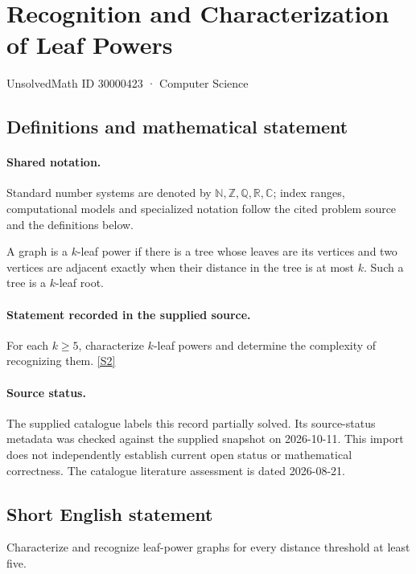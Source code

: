 \documentclass[11pt]{article}
\newcommand{\sref}[2]{\hyperlink{source:#1:#2}{[S#2]}}
\begin{document}
\setcounter{section}{30000422}
\section{Recognition and Characterization of Leaf Powers}\label{30000423}
{\small\sffamily UnsolvedMath ID 30000423 · Computer Science}
\subsection{Definitions and mathematical statement}

\paragraph{Shared notation.}Standard number systems are denoted by $\mathbb N,\mathbb Z,\mathbb Q,\mathbb R,\mathbb C$; index ranges, computational models and specialized notation follow the cited problem source and the definitions below.


A graph is a $k$-leaf power if there is a tree whose leaves are its vertices and two vertices are adjacent exactly when their distance in the tree is at most $k$. Such a tree is a $k$-leaf root.
\paragraph{Statement recorded in the supplied source.}
For each $k\geq5$, characterize $k$-leaf powers and determine the complexity of recognizing them. \sref{30000423}{2}
\paragraph{Source status.}
The supplied catalogue labels this record partially solved. Its source-status metadata was checked against the supplied snapshot on 2026-10-11. This import does not independently establish current open status or mathematical correctness. The catalogue literature assessment is dated 2026-08-21.
\subsection{Short English statement}
Characterize and recognize leaf-power graphs for every distance threshold at least five.
\end{document}
